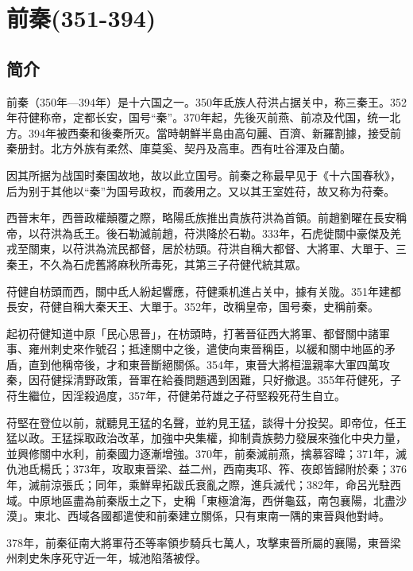 

\section{前秦\tiny(351-394)}

\subsection{简介}

前秦（350年—394年）是十六国之一。350年氐族人苻洪占据关中，称三秦王。352年苻健称帝，定都长安，国号“秦”。370年起，先後灭前燕、前凉及代国，统一北方。394年被西秦和後秦所灭。當時朝鮮半島由高句麗、百濟、新羅割據，接受前秦册封。北方外族有柔然、庫莫奚、契丹及高車。西有吐谷渾及白蘭。

因其所据为战国时秦国故地，故以此立国号。前秦之称最早见于《十六国春秋》，后为别于其他以“秦”为国号政权，而袭用之。又以其王室姓苻，故又称为苻秦。

西晉末年，西晉政權顛覆之際，略陽氐族推出貴族苻洪為首領。前趙劉曜在長安稱帝，以苻洪為氐王。後石勒滅前趙，苻洪降於石勒。333年，石虎徙關中豪傑及羌戎至關東，以苻洪為流民都督，居於枋頭。苻洪自稱大都督、大將軍、大單于、三秦王，不久為石虎舊將麻秋所毒死，其第三子苻健代統其眾。

苻健自枋頭而西，關中氐人紛起響應，苻健乘机進占关中，據有关陇。351年建都長安，苻健自稱大秦天王、大單于。352年，改稱皇帝，国号秦，史稱前秦。

起初苻健知道中原「民心思晉」，在枋頭時，打著晉征西大將軍、都督關中諸軍事、雍州刺史來作號召；抵達關中之後，遣使向東晉稱臣，以緩和關中地區的矛盾，直到他稱帝後，才和東晉斷絕關係。354年，東晉大將桓溫親率大軍四萬攻秦，因苻健採清野政策，晉軍在給養問題遇到困難，只好撤退。355年苻健死，子苻生繼位，因淫殺過度，357年，苻健弟苻雄之子苻堅殺死苻生自立。

苻堅在登位以前，就聽見王猛的名聲，並約見王猛，談得十分投契。即帝位，任王猛以政。王猛採取政治改革，加強中央集權，抑制貴族勢力發展來強化中央力量，並興修關中水利，前秦國力逐漸增強。370年，前秦滅前燕，擒慕容暐；371年，滅仇池氐楊氏；373年，攻取東晉梁、益二州，西南夷邛、筰、夜郎皆歸附於秦；376年，滅前涼張氏；同年，乘鮮卑拓跋氏衰亂之際，進兵滅代；382年，命呂光駐西域。中原地區盡為前秦版土之下，史稱「東極滄海，西併龜茲，南包襄陽，北盡沙漠」。東北、西域各國都遣使和前秦建立關係，只有東南一隅的東晉與他對峙。

378年，前秦征南大將軍苻丕等率領步騎兵七萬人，攻擊東晉所屬的襄陽，東晉梁州刺史朱序死守近一年，城池陷落被俘。

